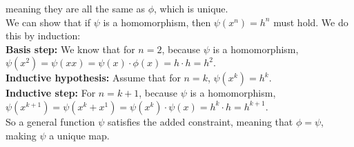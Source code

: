 \documentclass{article}
\begin{document}
    meaning they are all the same as $\phi$, which is unique. \\
    We can show that if $\psi$ is a homomorphism,
    then $\psi(x^n) = h^n$ must hold.
    We do this by induction: \\
    \textbf{Basis step:}
    We know that for $n = 2$,
    because $\psi$ is a homomorphism,
    $\psi(x^2) = \psi(xx)
    = \psi(x) \cdot \phi(x) = h \cdot h = h^2$. \\
    \textbf{Inductive hypothesis:}
    Assume that for $n = k$, $\psi(x^k) = h^k$. \\ 
    \textbf{Inductive step:}
    For $n = k + 1$, because $\psi$ is a homomorphism,
    $\psi(x^{k + 1}) = \psi(x^k + x^1)
    = \psi(x^k) \cdot \psi(x) = h^k \cdot h = h^{k+1}$. \\
    So a general function $\psi$ satisfies the added constraint,
    meaning that $\phi = \psi$,
    making $\psi$ a unique map.
\end{document}
